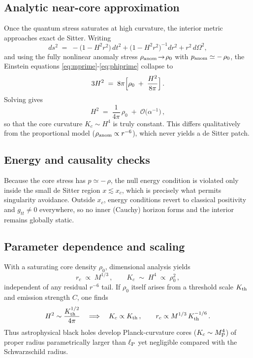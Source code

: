 \subsection{Analytic near-core approximation}
\label{sec:analytic}

Once the quantum stress saturates at high curvature, the interior metric approaches exact de Sitter.  Writing
\[
  ds^2 \;=\; -\bigl(1 - H^2 r^2\bigr)\,dt^2
    + \bigl(1 - H^2 r^2\bigr)^{-1}dr^2
    + r^2\,d\Omega^2,
\]
and using the fully nonlinear anomaly stress
\(\rho_{\rm anom}\!\to\!\rho_0\) with \(p_{\rm anom}\simeq -\,\rho_0\), the Einstein equations 
\eqref{eq:mprime}-\eqref{eq:phiprime} collapse to
\[
  3H^2 \;=\; 8\pi\Bigl[\rho_0 \;+\;\frac{H^2}{8\pi}\Bigr]\,.
\]
Solving gives
\[
  H^2 \;=\;\frac{1}{4\pi}\,\rho_0
    \;+\;\mathcal{O}\bigl(\alpha^{-1}\bigr)\,,
\]
so that the core curvature \(K_c\sim H^4\) is truly constant.  This differs qualitatively from the proportional model (\(\rho_{\rm anom}\propto r^{-6}\)), which never yields a de Sitter patch.

\subsection{Energy and causality checks}
\label{sec:checks}

Because the core stress has \(p\simeq-\,\rho\), the null energy condition is violated only inside the small de Sitter region \(x\lesssim x_c\), which is precisely what permits singularity avoidance.  Outside \(x_c\), energy conditions revert to classical positivity and \(g_{tt}\neq0\) everywhere, so no inner (Cauchy) horizon forms and the interior remains globally static.

\subsection{Parameter dependence and scaling}
\label{sec:param_scan}

With a saturating core density \(\rho_0\), dimensional analysis yields
\[
  r_c\;\propto\;M^{1/3}\,, 
  \qquad 
  K_c \;\sim\; H^4 \;\propto\;\rho_0^2\,,
\]
independent of any residual \(r^{-6}\) tail.  If \(\rho_0\) itself arises from a threshold scale \(K_{\rm th}\) and emission strength \(C\), one finds
\[
  H^2\sim\frac{K_{\rm th}^{1/2}}{4\pi}\quad\Longrightarrow\quad
  K_c\propto K_{\rm th}\,,\qquad
  r_c\propto M^{1/3}\,K_{\rm th}^{-1/6}\,.
\]
Thus astrophysical black holes develop Planck-curvature cores (\(K_c\sim M_{\rm P}^4\)) of proper radius parametrically larger than \(\ell_{\rm P}\) yet negligible compared with the Schwarzschild radius.
